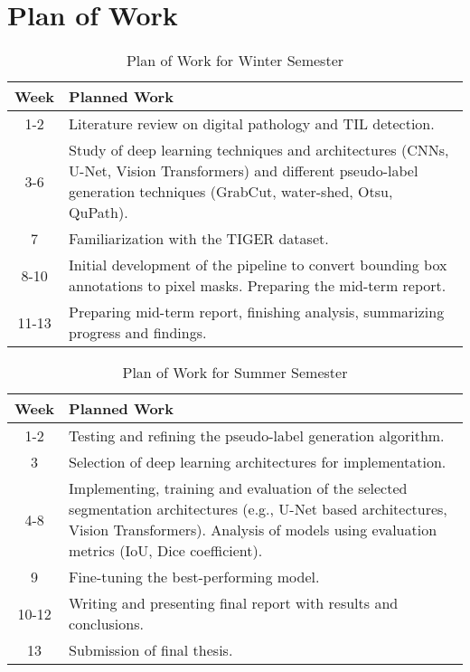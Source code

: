 \setcounter{figure}{0}
\setcounter{listing}{0}

\chapter{Plan of Work \label{cha:chapter1} }
\renewcommand{\thepage}{A-\arabic{page}}
\setcounter{page}{1}

\begin{table}[h!]
\centering
\begin{tabular}{|c|p{12.5cm}|}
\hline
\textbf{Week} & \textbf{Planned Work} \\ 
\hline
\hline
1-2 & Literature review on digital pathology and TIL detection. \\ 
\hline
3-6 & Study of deep learning techniques and architectures (CNNs, U-Net, Vision Transformers) and different pseudo-label generation techniques (GrabCut, water-shed, Otsu, QuPath). \\
\hline
7 & Familiarization with the TIGER dataset. \\
\hline
8-10 & Initial development of the pipeline to convert bounding box annotations to pixel masks. Preparing the mid-term report. \\ 
\hline
11-13 & Preparing mid-term report, finishing analysis, summarizing progress and findings. \\ 
\hline
\end{tabular}
\caption{Plan of Work for Winter Semester}
\label{tab:winter_plan}
\end{table}

\begin{table}[h!]
\centering
\begin{tabular}{|c|p{12.5cm}|}
\hline
\textbf{Week} & \textbf{Planned Work} \\ 
\hline
\hline
1-2 & Testing and refining the pseudo-label generation algorithm. \\
\hline
3 & Selection of deep learning architectures for implementation. \\ 
\hline
4-8 & Implementing, training and evaluation of the selected segmentation architectures (e.g., U-Net based architectures, Vision Transformers). Analysis of models using evaluation metrics (IoU, Dice coefficient). \\ 
\hline
9 & Fine-tuning the best-performing model. \\ 
\hline
10-12 & Writing and presenting final report with results and conclusions. \\ 
\hline
13 & Submission of final thesis. \\ 
\hline
\end{tabular}
\caption{Plan of Work for Summer Semester}
\label{tab:summer_plan}
\end{table}
